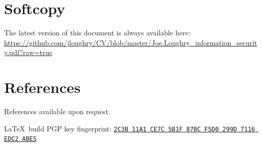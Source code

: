 \documentclass[12pt,twoside,letterpaper]{article}
\begin{document}
\vspace{-4mm}
\section*{Softcopy}
\vspace{-2mm}

The latest version of this document is always available here:
\url{https://github.com/jloughry/CV/blob/master/Joe.Loughry_information_security.pdf?raw=true}

\vspace{-4mm}
\section*{References}
\vspace{-2mm}

References available upon request.

\vfill
{\noindent\tiny \LaTeX\ build }
\hfill
PGP key fingerprint:
\href{http://call-with-current-continuation.com/Joe.Loughry.txt}%
{\texttt{2C3B 11A1 CE7C 5B1F 87BC  F5D0 299D 7116 EDC2 ABE5}}
\end{document}
